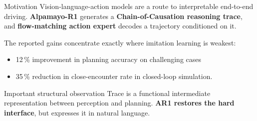 \documentclass[aspectratio=169,11pt,t]{beamer}
\newcommand{\refcite}[1]{\textcolor{tuered}{\scriptsize\cite{#1}}}
\begin{document}
\begin{frame}{Motivation}
  Vision-language-action models are a route to interpretable end-to-end
  driving. \textbf{Alpamayo-R1}\refcite{NVIDIA2025AlpamayoR1} generates a
  \textbf{Chain-of-Causation reasoning trace}, and \textbf{flow-matching action expert} decodes
  a trajectory conditioned on it.

  \vspace{0.4em}
  The reported gains concentrate exactly where imitation learning is weakest: \\
  \begin{itemize}
    \item \alert{12\,\% improvement in planning accuracy on challenging cases} \\
    \item \alert{35\,\% reduction in close-encounter rate} in closed-loop simulation.
  \end{itemize}

  \vspace{0.4em}
  \begin{alertblock}{Important structural observation}
  Trace is a functional intermediate representation between perception and planning.
    \textbf{AR1 restores the hard interface}, but expresses it in natural
    language.
  \end{alertblock}
\end{frame}
\end{document}
